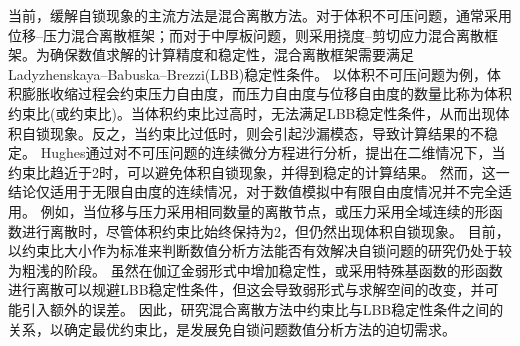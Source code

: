 当前，缓解自锁现象的主流方法是混合离散方法。对于体积不可压问题，通常采用位移--压力混合离散框架；而对于中厚板问题，则采用挠度--剪切应力混合离散框架。为确保数值求解的计算精度和稳定性，混合离散框架需要满足Ladyzhenskaya--Babuska--Brezzi(LBB)稳定性条件。
以体积不可压问题为例，体积膨胀收缩过程会约束压力自由度，而压力自由度与位移自由度的数量比称为体积约束比(或约束比)。当体积约束比过高时，无法满足LBB稳定性条件，从而出现体积自锁现象\cite{hughes2000,bathe1996}。反之，当约束比过低时，则会引起沙漏模态，导致计算结果的不稳定\cite{Pantuso1997}。
Hughes\cite{hughes2000}通过对不可压问题的连续微分方程进行分析，提出在二维情况下，当约束比趋近于2时，可以避免体积自锁现象，并得到稳定的计算结果。
然而，这一结论仅适用于无限自由度的连续情况，对于数值模拟中有限自由度情况并不完全适用。
例如，当位移与压力采用相同数量的离散节点\cite{bathe1996}，或压力采用全域连续的形函数进行离散时\cite{Huerta2001,Taylor2011}，尽管体积约束比始终保持为2，但仍然出现体积自锁现象。
目前，以约束比大小作为标准来判断数值分析方法能否有效解决自锁问题的研究仍处于较为粗浅的阶段。
虽然在伽辽金弱形式中增加稳定性\cite{wu2013,Rossi2021}，或采用特殊基函数的形函数进行离散\cite{Vidal2002}可以规避LBB稳定性条件，但这会导致弱形式与求解空间的改变，并可能引入额外的误差。
因此，研究混合离散方法中约束比与LBB稳定性条件之间的关系，以确定最优约束比，是发展免自锁问题数值分析方法的迫切需求。


